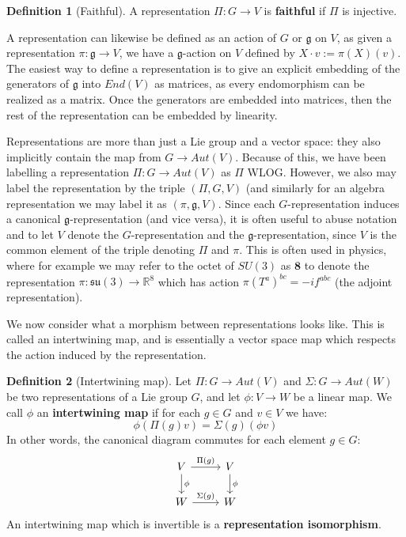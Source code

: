 \documentclass[11pt, oneside]{article}   	%
\theoremstyle{definition}
\newtheorem{definition}{Definition}[section]
\begin{document}
\begin{definition}[Faithful]
	A representation $\Pi : G\rightarrow V$ is \textbf{faithful} if $\Pi$ is injective. 
\end{definition}

A representation can likewise be defined as an action of $G$ or $\mathfrak g$ on $V$, as given a 
representation $\pi : \mathfrak g\rightarrow V$, we have a $\mathfrak g$-action on $V$ defined 
by $X\cdot v := \pi(X)(v)$. The easiest way to define a representation is to give an explicit 
embedding of the generators of $\mathfrak g$ into $End(V)$ as matrices, as every endomorphism 
can be realized as a matrix. Once the generators are embedded into matrices, then the rest of 
the representation can be embedded by linearity. 

Representations are more than just a Lie group and a vector space: they also implicitly contain the 
map from $G\rightarrow Aut(V)$. Because of this, we have been labelling a representation $\Pi : G\rightarrow 
Aut(V)$ as $\Pi$ WLOG. However, we also may label the representation by the triple $(\Pi, G, V)$ 
(and similarly for an algebra representation we may label it as $(\pi, \mathfrak g, V)$. Since each 
$G$-representation induces a canonical $\mathfrak g$-representation (and vice versa), it is often 
useful to abuse notation and to let $V$ denote the $G$-representation and the $\mathfrak g$-representation, 
since $V$ is the common element of the triple denoting $\Pi$ and $\pi$. This is often used in physics, where 
for example we may refer to the octet of $SU(3)$ as $\textbf{8}$ to denote the representation $\pi : \mathfrak{su}(3)
\rightarrow\mathbb R^8$ which has action $\pi(T^a)^{bc} = - if^{abc}$ (the adjoint representation). 

We now consider what a morphism between representations looks like. This is called an intertwining map, and 
is essentially a vector space map which respects the action induced by the representation. 

\begin{definition}[Intertwining map]
	Let $\Pi : G\rightarrow Aut(V)$ and $\Sigma : G\rightarrow Aut(W)$ be two representations of a Lie group $G$, 
	and let $\phi : V\rightarrow W$ be a linear map. We call $\phi$ an \textbf{intertwining map} if for each $g\in G$ 
	and $v\in V$ we have:
	\begin{equation}
		\phi(\Pi(g) v) = \Sigma(g) (\phi v)
	\end{equation}
	In other words, the canonical diagram commutes for each element $g\in G$:
	\[\begin{tikzcd}
		V\arrow[r, "\Pi(g)"]\arrow[d, "\phi"] & V\arrow[d, "\phi"] \\
		W\arrow[r, "\Sigma(g)"] & W
	\end{tikzcd}\]
	An intertwining map which is invertible is a \textbf{representation isomorphism}. 
\end{definition}
\end{document}
